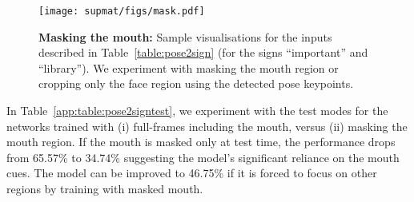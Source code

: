 \begin{figure}[t]
    \centering
    \texttt{[image: supmat/figs/mask.pdf]}
    \caption{\textbf{Masking the mouth:} Sample visualisations for the inputs
    described in
    Table~\ref{table:pose2sign}
(for the signs ``important'' and ``library''). We experiment with masking the mouth
    region or cropping only the face region using the detected pose keypoints.
    }
    \label{app:fig:mask}
\end{figure}
In Table~\ref{app:table:pose2signtest},
we experiment with the test modes for the networks trained with
(i) full-frames including the mouth, versus
(ii) masking the mouth region.
If the mouth is masked only
at test time, the performance drops from 65.57\% to 34.74\%
suggesting the model's significant reliance on the mouth cues.
The model can be improved to 46.75\% if it is forced to
focus on other regions by training with masked mouth.

\begin{table}[t]
    \centering
    \caption{We complement
        Table~\ref{table:pose2sign}
by investigating different test modes for I3D, when trained with
        or without the mouth pixels. The model trained with full-frames
        relies significantly on the mouth, whose performance drops from 65.57\%
        to 34.74\% when the mouth is masked. The models are trained on
        the subset of \datasetName{}$_{m.8}$ where pose estimates are available.
    }
    \label{app:table:pose2signtest}
\end{table}

